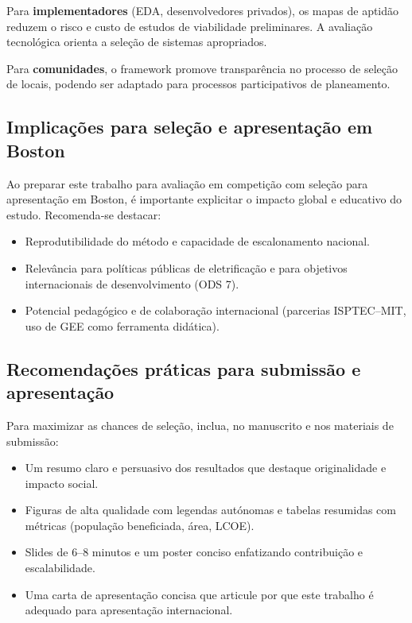 \documentclass[12pt, a4paper]{article}
\begin{document}
Para \textbf{implementadores} (EDA, desenvolvedores privados), os mapas de aptidão reduzem o risco e custo de estudos de viabilidade preliminares. A avaliação tecnológica orienta a seleção de sistemas apropriados.

Para \textbf{comunidades}, o framework promove transparência no processo de seleção de locais, podendo ser adaptado para processos participativos de planeamento.

\subsection{Implicações para seleção e apresentação em Boston}
Ao preparar este trabalho para avaliação em competição com seleção para apresentação em Boston, é importante explicitar o impacto global e educativo do estudo. Recomenda‑se destacar:
\begin{itemize}
    \item Reprodutibilidade do método e capacidade de escalonamento nacional.
    \item Relevância para políticas públicas de eletrificação e para objetivos internacionais de desenvolvimento (ODS 7).
    \item Potencial pedagógico e de colaboração internacional (parcerias ISPTEC–MIT, uso de GEE como ferramenta didática).
\end{itemize}

\subsection{Recomendações práticas para submissão e apresentação}
Para maximizar as chances de seleção, inclua, no manuscrito e nos materiais de submissão:
\begin{itemize}
    \item Um resumo claro e persuasivo dos resultados que destaque originalidade e impacto social.
    \item Figuras de alta qualidade com legendas autónomas e tabelas resumidas com métricas (população beneficiada, área, LCOE).
    \item Slides de 6–8 minutos e um poster conciso enfatizando contribuição e escalabilidade.
    \item Uma carta de apresentação concisa que articule por que este trabalho é adequado para apresentação internacional.
\end{itemize}

\end{document}
